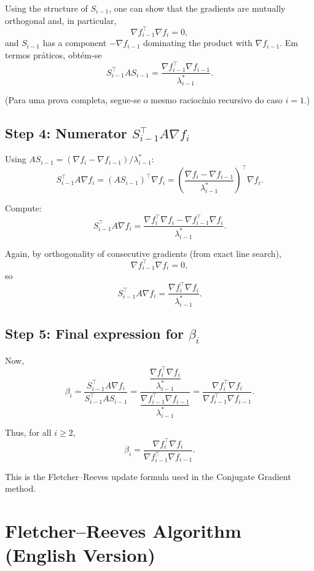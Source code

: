 \documentclass[9pt,a4paper]{extarticle}
\begin{document}
Using the structure of $S_{i-1}$, one can show that the gradients are mutually orthogonal and, in particular,
\[
\nabla f_{i-1}^\top \nabla f_i = 0,
\]
and $S_{i-1}$ has a component $-\nabla f_{i-1}$ dominating the product with $\nabla f_{i-1}$. Em termos práticos, obtém-se
\[
S_{i-1}^\top A S_{i-1} = \frac{\nabla f_{i-1}^\top \nabla f_{i-1}}{\lambda_{i-1}^*}.
\]

(Para uma prova completa, segue-se o mesmo raciocínio recursivo do caso $i=1$.)

\subsection*{Step 4: Numerator $S_{i-1}^\top A \nabla f_i$}

Using $A S_{i-1} = (\nabla f_i - \nabla f_{i-1})/\lambda_{i-1}^*$:
\[
S_{i-1}^\top A \nabla f_i
= (A S_{i-1})^\top \nabla f_i
= \left( \frac{\nabla f_i - \nabla f_{i-1}}{\lambda_{i-1}^*} \right)^\top \nabla f_i.
\]

Compute:
\[
S_{i-1}^\top A \nabla f_i
= \frac{\nabla f_i^\top \nabla f_i - \nabla f_{i-1}^\top \nabla f_i}{\lambda_{i-1}^*}.
\]

Again, by orthogonality of consecutive gradients (from exact line search),
\[
\nabla f_{i-1}^\top \nabla f_i = 0,
\]
so
\[
S_{i-1}^\top A \nabla f_i
= \frac{\nabla f_i^\top \nabla f_i}{\lambda_{i-1}^*}.
\]

\subsection*{Step 5: Final expression for \texorpdfstring{$\beta_i$}{beta\_i}}

Now,
\[
\beta_i = \frac{S_{i-1}^\top A \nabla f_i}{S_{i-1}^\top A S_{i-1}}
= \frac{\dfrac{\nabla f_i^\top \nabla f_i}{\lambda_{i-1}^*}}{\dfrac{\nabla f_{i-1}^\top \nabla f_{i-1}}{\lambda_{i-1}^*}}
= \frac{\nabla f_i^\top \nabla f_i}{\nabla f_{i-1}^\top \nabla f_{i-1}}.
\]

Thus, for all $i \ge 2$,
\[
\beta_i =
\frac{\nabla f_i^\top \nabla f_i}{\nabla f_{i-1}^\top \nabla f_{i-1}}.
\]

This is the Fletcher--Reeves update formula used in the Conjugate Gradient method.

\section{Fletcher--Reeves Algorithm (English Version)}
\end{document}

